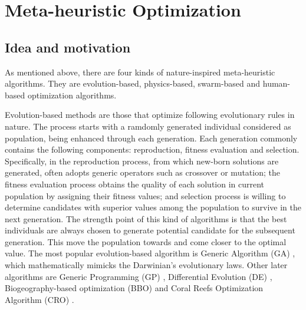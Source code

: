 \documentclass[../main.tex]{subfiles}
\begin{document}
\section{Meta-heuristic Optimization}
\label{sec:meta_heuristic}	

\subsection{Idea and motivation}

	As mentioned above, there are four kinds of nature-inspired meta-heuristic algorithms. They are evolution-based, physics-based, swarm-based and human-based optimization algorithms.
	
	Evolution-based methods are those that optimize following evolutionary rules in nature. The process starts with a ramdomly generated individual considered as population, being enhanced through each generation. Each generation commonly contains the following components: reproduction, fitness evaluation and selection. Specifically, in the reproduction process, from which new-born solutions are generated, often adopts generic operators such as crossover or mutation; the fitness evaluation process obtains the quality of each solution in current population by assigning their fitness values; and selection process is willing to determine candidates with superior values among the population to survive in the next generation. The strength point of this kind of algorithms is that the best individuals are always chosen to generate potential candidate for the subsequent generation. This move the population towards and come closer to the optimal value. The most popular evolution-based algorithm is Generic Algorithm (GA) \cite{holland1992genetic}, which mathematically mimicks the Darwinian's evolutionary laws. Other later algorithms are Generic Programming (GP) \cite{koza1997genetic}, Differential Evolution (DE) \cite{fleetwood2004introduction}, Biogeography-based optimization (BBO) \cite{simon2008biogeography} and Coral Reefs Optimization Algorithm (CRO) \cite{salcedo2013novel}. 
	
\end{document}
